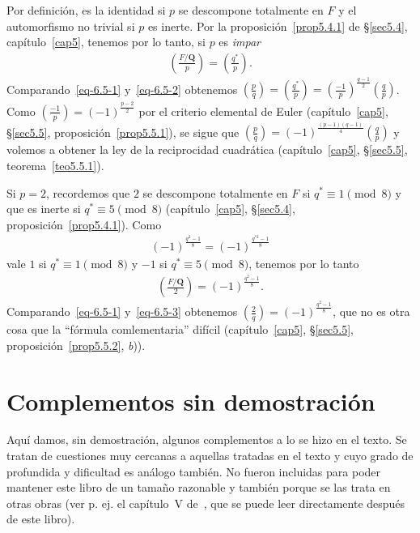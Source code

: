 \documentclass[bibtotoc,leqno,spanish]{amsbook}
\newcommand{\QQ}{\mathbf{Q}}
\numberwithin{equation}{section}
\theoremstyle{note}
\theoremstyle{note}
\theoremstyle{rem}
\numberwithin{theorem}{section}
\numberwithin{proposition}{section}
\numberwithin{definition}{section}
\numberwithin{lemma}{section}
\numberwithin{corollary}{section}
\numberwithin{example}{section}
\numberwithin{footnote}{section}%
\begin{document}
Por definici\'on, es la identidad si $p$ se descompone totalmente en $F$ y el automorfismo no trivial si $p$
es inerte. Por la proposici\'on~\ref{prop5.4.1} de \S\ref{sec5.4}, cap\'itulo~\ref{cap5}, tenemos por lo tanto, si $p$ es {\em impar}
\begin{gather}\label{eq-6.5-2}
\left(\frac{F/\QQ}{p}\right) = \left(\frac{q^{*}}{p}\right).
\end{gather}
Comparando~\eqref{eq-6.5-1} y~\eqref{eq-6.5-2} obtenemos $\left(\frac{p}{q}\right)=\left(\frac{q^{*}}{p}\right)
=\left(\frac{-1}{p}\right)^{\frac{q-1}{2}}\left(\frac{q}{p}\right)$. Como $\left(\frac{-1}{p}\right)=(-1)^{\frac{p-2}{2}}$
por el criterio elemental de Euler (cap\'itulo~\ref{cap5}, \S\ref{sec5.5}, proposici\'on~\ref{prop5.5.1}), se sigue que $\left(\frac{p}{q}\right)
=(-1)^{\frac{(p-1)(q-1)}{4}}\left(\frac{q}{p}\right)$ y volemos a obtener la ley de la reciprocidad cuadr\'atica
(cap\'itulo~\ref{cap5}, \S\ref{sec5.5}, teorema~\ref{teo5.5.1}).

Si $p=2$, recordemos que $2$ se descompone totalmente en $F$ si $q^{*}\equiv 1\pmod 8$ y que es inerte
si $q^{*}\equiv 5\pmod 8$ (cap\'itulo~\ref{cap5}, \S\ref{sec5.4}, proposici\'on~\ref{prop5.4.1}). Como
\begin{gather*}
(-1)^{\frac{q^{2}-1}{8}}=(-1)^{\frac{q^{*2}-1}{8}}
\end{gather*}
vale $1$ si $q^{*}\equiv 1\pmod 8$ y $-1$ si $q^{*}\equiv 5\pmod 8$, tenemos por lo tanto
\begin{gather}\label{eq-6.5-3}
\left(\frac{F/\QQ}{2}\right)=(-1)^{\frac{q^{2}-1}{8}}.
\end{gather}
Comparando~\eqref{eq-6.5-1} y~\eqref{eq-6.5-3} obtenemos $\left(\frac{2}{q}\right) = (-1)^{\frac{q^{2}-1}{8}}$,
que no es otra cosa que la ``f\'ormula comlementaria'' dif\'icil (cap\'itulo~\ref{cap5}, \S\ref{sec5.5},
proposici\'on~\ref{prop5.5.2}, {\itshape b})).

\chapter*{Complementos sin demostraci\'on}

\setcounter{equation}{0}

Aqu\'i damos, sin demostraci\'on, algunos complementos a lo se hizo en el texto. Se tratan de cuestiones
muy cercanas a aquellas tratadas en el texto y cuyo grado de profundida y dificultad es an\'alogo tambi\'en.
No fueron incluidas para poder mantener este libro de un tama\~no razonable y tambi\'en porque se las trata
en otras obras (ver p. ej. el cap\'itulo~V de~\cite{ZariskiSamuel}, que se puede leer directamente despu\'es de este
libro).
\end{document}
